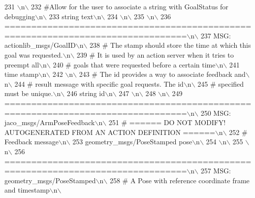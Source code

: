 \begin{DoxyCode}
231 \textcolor{stringliteral}{\(\backslash\)n\(\backslash\)}
232 \textcolor{stringliteral}{#Allow for the user to associate a string with GoalStatus for debugging\(\backslash\)n\(\backslash\)}
233 \textcolor{stringliteral}{string text\(\backslash\)n\(\backslash\)}
234 \textcolor{stringliteral}{\(\backslash\)n\(\backslash\)}
235 \textcolor{stringliteral}{\(\backslash\)n\(\backslash\)}
236 \textcolor{stringliteral}{================================================================================\(\backslash\)n\(\backslash\)}
237 \textcolor{stringliteral}{MSG: actionlib\_msgs/GoalID\(\backslash\)n\(\backslash\)}
238 \textcolor{stringliteral}{# The stamp should store the time at which this goal was requested.\(\backslash\)n\(\backslash\)}
239 \textcolor{stringliteral}{# It is used by an action server when it tries to preempt all\(\backslash\)n\(\backslash\)}
240 \textcolor{stringliteral}{# goals that were requested before a certain time\(\backslash\)n\(\backslash\)}
241 \textcolor{stringliteral}{time stamp\(\backslash\)n\(\backslash\)}
242 \textcolor{stringliteral}{\(\backslash\)n\(\backslash\)}
243 \textcolor{stringliteral}{# The id provides a way to associate feedback and\(\backslash\)n\(\backslash\)}
244 \textcolor{stringliteral}{# result message with specific goal requests. The id\(\backslash\)n\(\backslash\)}
245 \textcolor{stringliteral}{# specified must be unique.\(\backslash\)n\(\backslash\)}
246 \textcolor{stringliteral}{string id\(\backslash\)n\(\backslash\)}
247 \textcolor{stringliteral}{\(\backslash\)n\(\backslash\)}
248 \textcolor{stringliteral}{\(\backslash\)n\(\backslash\)}
249 \textcolor{stringliteral}{================================================================================\(\backslash\)n\(\backslash\)}
250 \textcolor{stringliteral}{MSG: jaco\_msgs/ArmPoseFeedback\(\backslash\)n\(\backslash\)}
251 \textcolor{stringliteral}{# ====== DO NOT MODIFY! AUTOGENERATED FROM AN ACTION DEFINITION ======\(\backslash\)n\(\backslash\)}
252 \textcolor{stringliteral}{# Feedback message\(\backslash\)n\(\backslash\)}
253 \textcolor{stringliteral}{geometry\_msgs/PoseStamped pose\(\backslash\)n\(\backslash\)}
254 \textcolor{stringliteral}{\(\backslash\)n\(\backslash\)}
255 \textcolor{stringliteral}{\(\backslash\)n\(\backslash\)}
256 \textcolor{stringliteral}{================================================================================\(\backslash\)n\(\backslash\)}
257 \textcolor{stringliteral}{MSG: geometry\_msgs/PoseStamped\(\backslash\)n\(\backslash\)}
258 \textcolor{stringliteral}{# A Pose with reference coordinate frame and timestamp\(\backslash\)n\(\backslash\)}

\end{DoxyCode}
